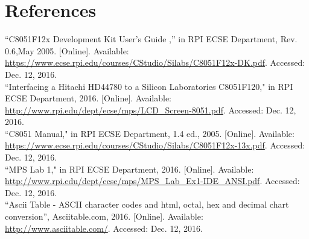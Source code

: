 \documentclass[12pt]{article}
\begin{document}
\section{References} 
\noindent
[1]``C8051F12x Development Kit User's Guide ,'' in RPI ECSE Department, Rev. 0.6,May 2005. [Online]. Available: \url{https://www.ecse.rpi.edu/courses/CStudio/Silabs/C8051F12x-DK.pdf}. Accessed: Dec. 12, 2016.\\
\newline\noindent
[2]``Interfacing a Hitachi HD44780 to a Silicon Laboratories C8051F120," in RPI ECSE Department, 2016. [Online]. Available: \url{http://www.rpi.edu/dept/ecse/mps/LCD_Screen-8051.pdf}. Accessed: Dec. 12, 2016.\\
\newline\noindent
[3]``C8051 Manual," in RPI ECSE Department, 1.4 ed., 2005. [Online]. Available: \url{https://www.ecse.rpi.edu/courses/CStudio/Silabs/C8051F12x-13x.pdf}. Accessed: Dec. 12, 2016.\\
\newline\noindent
[4]``MPS Lab 1," in RPI ECSE Department, 2016. [Online]. Available: \url{http://www.rpi.edu/dept/ecse/mps/MPS_Lab_Ex1-IDE_ANSI.pdf}. Accessed: Dec. 12, 2016.\\
\newline\noindent
[5]``Ascii Table - ASCII character codes and html, octal, hex and decimal chart conversion'', Asciitable.com, 2016. [Online]. Available: \url{http://www.asciitable.com/}. Accessed: Dec. 12, 2016.
	
	
\end{document}
